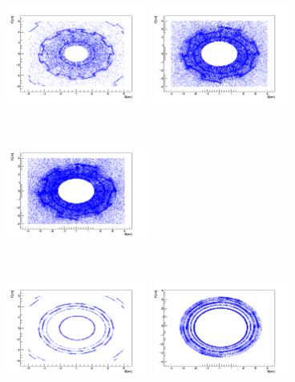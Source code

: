 \documentclass{cernatlasnote}
\begin{document}
  
\begin{figure}[htp]
\centering
\includegraphics[width=4.6cm, height=4.4cm]{images/emu_channel/2016/16_2D_plots/SecInt_XY_sele_eta_6.png}
\includegraphics[width=4.6cm, height=4.4cm]{images/emu_channel/2017/17_2D_plots/SecInt17_slec_eta_XY4.png}
 \includegraphics[width=4.6cm, height=4.4cm]{images/emu_channel/2018/18_2D_plots/SecInt18_XY_4_r1p5_sel.png}\\
 \includegraphics[width=4.6cm, height=4.4cm]{images/emu_channel/2016/16_2D_plots/SecInt_XY_tracker_match_eta_6.png}
\includegraphics[width=4.6cm, height=4.4cm]{images/emu_channel/2017/17_2D_plots/SecInt17_eta_tracker_match_XY4.png}

\end{figure}
\end{document}
